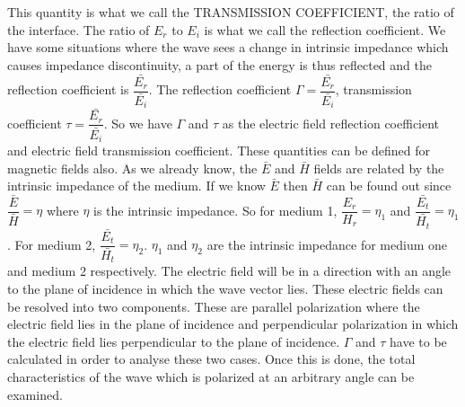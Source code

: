 This quantity is what we call the TRANSMISSION COEFFICIENT, the ratio of the interface. The ratio of $ E_r$ to $E_i$ is what we call the reflection coefficient. We have some situations where the wave sees a change in intrinsic impedance which causes impedance discontinuity, a part of the energy is thus reflected and the reflection coefficient is $\dfrac{\bar{E_r}}{\bar{E_i}}$. The reflection coefficient $\Gamma=\dfrac{\bar{E_r}}{\bar{E_i}}$, transmission coefficient $\tau=\dfrac{\bar{E_r}}{\bar{E_i}}$. So we have $\Gamma$ and $\tau$ as the electric field reflection coefficient and electric field transmission coefficient. These quantities can be defined for magnetic fields also. As we already know, the $\bar{E}$ and $\bar{ H}$ fields are related by the intrinsic impedance of the medium. If we know $\bar{E}$ then $\bar{H}$ can be found out since $\dfrac{\bar{E}}{\bar{H}}=\eta$ where $\eta$ is the intrinsic impedance. So for medium 1,  $\dfrac{E_r}{H_r}=\eta_1$  and $\dfrac{\bar{E_t}}{\bar{H_t}}=\eta_1$. For medium 2, $\dfrac{\bar{E_t}}{\bar{H_t}}=\eta_2$. $\eta_1$ and $\eta_2$ are the intrinsic impedance for medium one and medium 2 respectively. The electric field will be in a direction with an angle to the plane of incidence in which the wave vector lies. These electric fields can be resolved into two components. These are parallel polarization where the electric field lies in the plane of incidence and perpendicular polarization in which the electric field lies perpendicular to the plane of incidence. $\Gamma$ and $\tau$ have to be calculated in order to analyse these two cases. Once this is done, the total characteristics of the wave which is polarized at an arbitrary angle can be examined.


